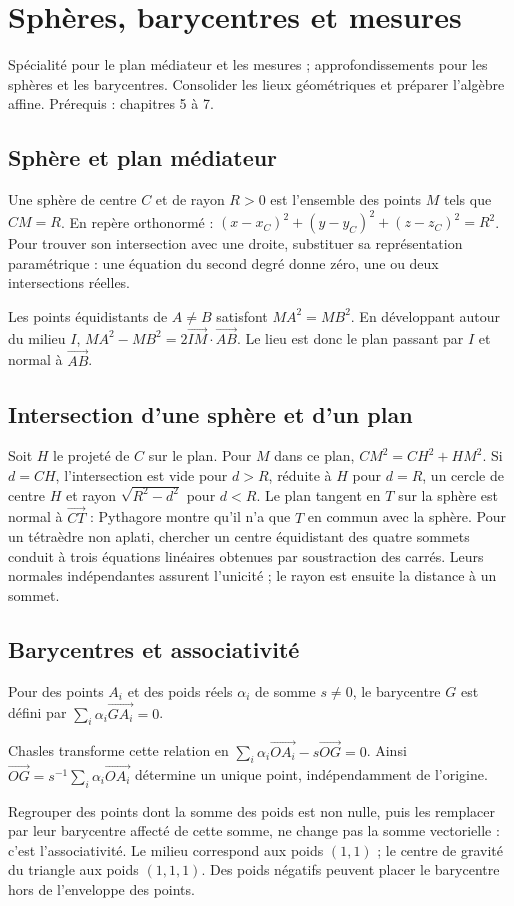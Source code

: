 \documentclass[../cours_tle.tex]{subfiles}
\begin{document}
\setcounter{chapter}{7}
\chapter{Sphères, barycentres et mesures}
\label{ch:8}
\begin{objectif}
Spécialité pour le plan médiateur et les mesures ; approfondissements pour les sphères et les barycentres. Consolider les lieux géométriques et préparer l'algèbre affine. Prérequis : chapitres 5 à 7.
\end{objectif}
\section{Sphère et plan médiateur}
Une sphère de centre $C$ et de rayon $R>0$ est l'ensemble des points $M$ tels que $CM=R$. En repère orthonormé :
$(x-x_C)^2+(y-y_C)^2+(z-z_C)^2=R^2$.
Pour trouver son intersection avec une droite, substituer sa représentation paramétrique : une équation du second degré donne zéro, une ou deux intersections réelles.

Les points équidistants de $A\ne B$ satisfont $MA^2=MB^2$. En développant autour du milieu $I$,
$MA^2-MB^2=2\overrightarrow{IM}\cdot\overrightarrow{AB}$.
Le lieu est donc le plan passant par $I$ et normal à $\overrightarrow{AB}$.
\section{Intersection d'une sphère et d'un plan}
Soit $H$ le projeté de $C$ sur le plan. Pour $M$ dans ce plan,
$CM^2=CH^2+HM^2$. Si $d=CH$, l'intersection est vide pour $d>R$, réduite à $H$ pour $d=R$, un cercle de centre $H$ et rayon $\sqrt{R^2-d^2}$ pour $d<R$.
Le plan tangent en $T$ sur la sphère est normal à $\overrightarrow{CT}$ : Pythagore montre qu'il n'a que $T$ en commun avec la sphère.
Pour un tétraèdre non aplati, chercher un centre équidistant des quatre sommets conduit à trois équations linéaires obtenues par soustraction des carrés. Leurs normales indépendantes assurent l'unicité ; le rayon est ensuite la distance à un sommet.
\section{Barycentres et associativité}
\begin{definition}
Pour des points $A_i$ et des poids réels $\alpha_i$ de somme $s\ne0$, le barycentre $G$ est défini par $\sum_i\alpha_i\overrightarrow{GA_i}=0$.
\end{definition}
\begin{demonstration}
Chasles transforme cette relation en
$\sum_i\alpha_i\overrightarrow{OA_i}-s\overrightarrow{OG}=0$.
Ainsi $\overrightarrow{OG}=s^{-1}\sum_i\alpha_i\overrightarrow{OA_i}$ détermine un unique point, indépendamment de l'origine.
\end{demonstration}
Regrouper des points dont la somme des poids est non nulle, puis les remplacer par leur barycentre affecté de cette somme, ne change pas la somme vectorielle : c'est l'associativité.
Le milieu correspond aux poids $(1,1)$ ; le centre de gravité du triangle aux poids $(1,1,1)$. Des poids négatifs peuvent placer le barycentre hors de l'enveloppe des points.
\end{document}
